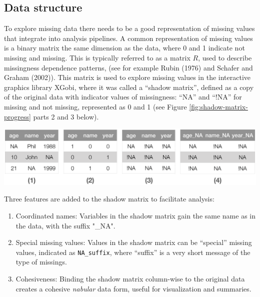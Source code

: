 \documentclass[]{article}
\let\origfigure\figure
\let\endorigfigure\endfigure
\renewenvironment{figure}[1][2] {
    \expandafter\origfigure\expandafter[H]
} {
    \endorigfigure
}
\theoremstyle{definition}
\theoremstyle{definition}
\theoremstyle{definition}
\theoremstyle{remark}
\begin{document}
\hypertarget{data-structure}{%
\subsection{Data structure}\label{data-structure}}

To explore missing data there needs to be a good representation of
missing values that integrate into analysis pipelines. A common
representation of missing values is a binary matrix the same dimension
as the data, where 0 and 1 indicate not missing and missing. This is
typically referred to as a matrix \(R\), used to describe missingness
dependence patterns, (see for example Rubin (1976) and Schafer and
Graham (2002)). This matrix is used to explore missing values in the
interactive graphics library XGobi, where it was called a ``shadow
matrix'', defined as a copy of the original data with indicator values
of missingness: ``NA'' and ``!NA'' for missing and not missing,
represented as 0 and 1 (see Figure \ref{fig:shadow-matrix-progress}
parts 2 and 3 below).

\begin{figure}

{\centering \includegraphics[width=1\linewidth]{images/full-conversion-to-shadow} 

}

\caption{Progression of creating shadow matrix data. (1-2) Data to a binary representation of missings, (2-3) Binary format converted to a shadow matrix (3-4) New and improved shadow matrix with changed variable names. This clearly links a variable to its state of missingness.}\label{fig:shadow-matrix-progress}
\end{figure}

Three features are added to the shadow matrix to facilitate analysis:

\begin{enumerate}
\def\labelenumi{\arabic{enumi}.}
\item
  Coordinated names: Variables in the shadow matrix gain the same name
  as in the data, with the suffix "\_NA".
\item
  Special missing values: Values in the shadow matrix can be ``special''
  missing values, indicated as \texttt{NA\_suffix}, where ``suffix'' is
  a very short message of the type of missings.
\item
  Cohesiveness: Binding the shadow matrix column-wise to the original
  data creates a cohesive \emph{nabular} data form, useful for
  visualization and summaries.
\end{enumerate}
\end{document}
